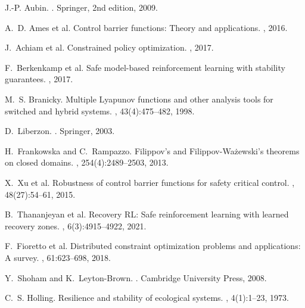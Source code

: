 \documentclass[11pt,a4paper]{article}
\begin{document}

\begin{thebibliography}{10}

J.-P. Aubin.
.
\newblock Springer, 2nd edition, 2009.

A.~D. Ames et al.
\newblock Control barrier functions: Theory and applications.
, 2016.

J.~Achiam et al.
\newblock Constrained policy optimization.
, 2017.

F.~Berkenkamp et al.
\newblock Safe model-based reinforcement learning with stability guarantees.
, 2017.

M.~S. Branicky.
\newblock Multiple Lyapunov functions and other analysis tools for switched and hybrid systems.
, 43(4):475--482, 1998.

D.~Liberzon.
.
\newblock Springer, 2003.

H.~Frankowska and C.~Rampazzo.
\newblock Filippov's and Filippov-Wa{\.z}ewski's theorems on closed domains.
, 254(4):2489--2503, 2013.

X.~Xu et al.
\newblock Robustness of control barrier functions for safety critical control.
, 48(27):54--61, 2015.

B.~Thananjeyan et al.
\newblock Recovery RL: Safe reinforcement learning with learned recovery zones.
, 6(3):4915--4922, 2021.

F.~Fioretto et al.
\newblock Distributed constraint optimization problems and applications: A survey.
, 61:623--698, 2018.

Y.~Shoham and K.~Leyton-Brown.
.
\newblock Cambridge University Press, 2008.

C.~S. Holling.
\newblock Resilience and stability of ecological systems.
, 4(1):1--23, 1973.


\end{thebibliography}
\end{document}
